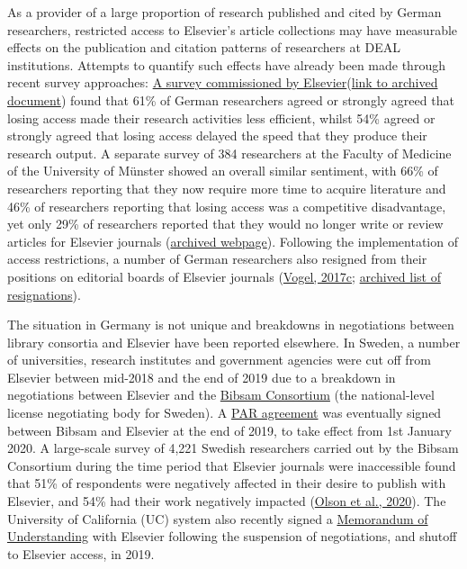 \documentclass[
]{article}
\begin{document}
As a provider of a large proportion of research published and cited by German researchers, restricted access to Elsevier's article collections may have measurable effects on the publication and citation patterns of researchers at DEAL institutions. Attempts to quantify such effects have already been made through recent survey approaches: \href{https://www.mynewsdesk.com/de/elsevier/documents/study-impact-of-access-cancellation-in-germany-89795}{A survey commissioned by Elsevier}(\href{https://web.archive.org/web/20210427160017/https://resources.mynewsdesk.com/image/upload/fl_attachment/sgmm6zhwdmam4ys7evvf}{link to archived document}) found that 61\% of German researchers agreed or strongly agreed that losing access made their research activities less efficient, whilst 54\% agreed or strongly agreed that losing access delayed the speed that they produce their research output. A separate survey of 384 researchers at the Faculty of Medicine of the University of Münster showed an overall similar sentiment, with 66\% of researchers reporting that they now require more time to acquire literature and 46\% of researchers reporting that losing access was a competitive disadvantage, yet only 29\% of researchers reported that they would no longer write or review articles for Elsevier journals (\href{https://web.archive.org/web/20210429122105/https://www.uni-muenster.de/ZBMed/aktuelles/27850}{archived webpage}). Following the implementation of access restrictions, a number of German researchers also resigned from their positions on editorial boards of Elsevier journals (\href{https://doi.org/10.1126/science.aar2142}{Vogel, 2017c}; \href{https://web.archive.org/web/20210427081142/https://www.projekt-deal.de/aktuelles-zu-elsevier/}{archived list of resignations}).

The situation in Germany is not unique and breakdowns in negotiations between library consortia and Elsevier have been reported elsewhere. In Sweden, a number of universities, research institutes and government agencies were cut off from Elsevier between mid-2018 and the end of 2019 due to a breakdown in negotiations between Elsevier and the \href{https://www.kb.se/samverkan-och-utveckling/oppen-tillgang-och-bibsamkonsortiet.html}{Bibsam Consortium} (the national-level license negotiating body for Sweden). A \href{https://www.kb.se/download/18.a9bd5bf1707b0801cd15e/1582893792629/Bibsam-Elsevier-2020-2022-tobepublished-titlelistexcluded.pdf}{PAR agreement} was eventually signed between Bibsam and Elsevier at the end of 2019, to take effect from 1st January 2020. A large-scale survey of 4,221 Swedish researchers carried out by the Bibsam Consortium during the time period that Elsevier journals were inaccessible found that 51\% of respondents were negatively affected in their desire to publish with Elsevier, and 54\% had their work negatively impacted (\href{http://doi.org/10.1629/uksg.507}{Olson et al., 2020}). The University of California (UC) system also recently signed a \href{https://ucsf.app.box.com/s/gb2zj4dmk3h11p4munjvt9gsvtxr84qw}{Memorandum of Understanding} with Elsevier following the suspension of negotiations, and shutoff to Elsevier access, in 2019.
\end{document}
